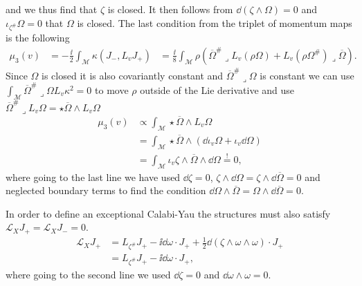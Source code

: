 and we thus find that $\zeta$ is closed. It then follows from $\dd(\zeta\wedge\Omega)=0$ and $\iota_{\zeta^{\#}}\Omega=0$ that $\Omega$ is closed. The last condition from the triplet of momentum maps is the following 
\begin{equation}
    \begin{aligned}
    \mu_3(v) &= -\frac{\ii}{2}\int_\mathcal{M}\kappa(J_-,L_vJ_+)
             &= \frac{\ii}{8}\int_\mathcal{M}\rho \left(\overbar{\Omega}^{\#}\lrcorner L_v(\rho \Omega)+L_v(\rho\Omega^{\#})\lrcorner \overbar{\Omega}\right).
    \end{aligned}
\end{equation}
Since $\Omega$ is closed it is also covariantly constant and $\overbar{\Omega}^{\#}\lrcorner \Omega$ is constant we can use $\int_\mathcal{M}\overbar{\Omega}^{\#}\lrcorner \Omega L_v\kappa^2=0$ to move $\rho$ outside of the Lie derivative and use $\overbar{\Omega}^{\#}\lrcorner L_v \Omega=\star\overbar{\Omega}\wedge L_v \Omega$  
\begin{equation}
    \begin{aligned}
    \mu_3(v) &\propto \int_\mathcal{M}\star\overbar{\Omega}\wedge L_v\Omega \\
            &= \int_\mathcal{M}\star\overbar{\Omega}\wedge (\dd\iota_v\Omega+\iota_v\dd \Omega)\\
            &= \int_{\mathcal{M}} \iota_v\zeta \wedge\overbar{\Omega}\wedge\dd\Omega \overset{!}{=}0,
    \end{aligned}
\end{equation}
where going to the last line we have used $\dd\zeta=0$, $\zeta\wedge\dd\Omega=\zeta\wedge\dd\overbar{\Omega}=0$ and neglected boundary terms to find the condition $\dd\Omega\wedge\overbar{\Omega}=\Omega\wedge\dd\overbar{\Omega}=0$. 

In order to define an exceptional Calabi-Yau the structures must also satisfy $\mathscr{L}_XJ_+=\mathscr{L}_XJ_-=0$.
\begin{equation}
    \begin{aligned}
    \mathscr{L}_X J_+ &= L_{\zeta^{\#}}J_+-\ii\dd\omega\cdot J_++\frac{1}{2}\dd(\zeta\wedge\omega\wedge\omega)\cdot J_+\\
    &= L_{\zeta^{\#}}J_+-\ii\dd\omega\cdot J_+,
    \end{aligned}
\end{equation}
where going to the second line we used $\dd\zeta=0$ and $\dd\omega\wedge\omega=0$. 

